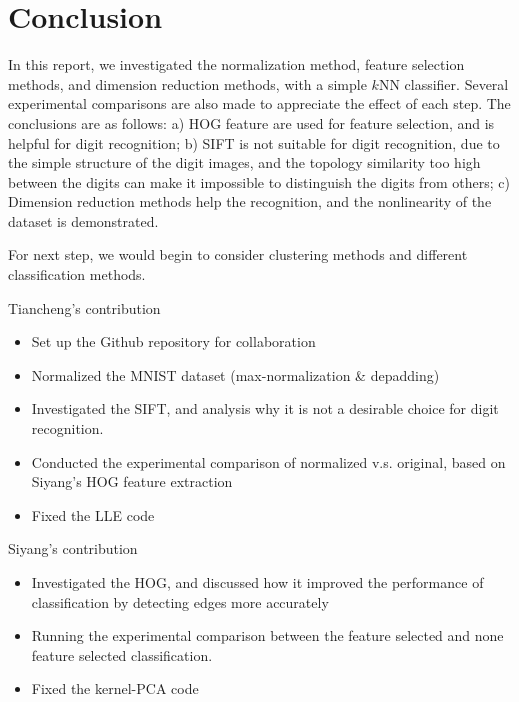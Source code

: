 \documentclass[12pt]{article}
\newenvironment{nscenter}
 {\parskip=0pt\par\nopagebreak\centering}
 {\par\noindent\ignorespacesafterend}
\begin{document}
\section{Conclusion}
In this report, we investigated the normalization method, feature selection methods, and dimension reduction methods, with a simple $k$NN classifier. Several experimental comparisons are also made to appreciate the effect of each step. The conclusions are as follows: a) HOG feature are used for feature selection, and is helpful for digit recognition; b) SIFT is not suitable for digit recognition, due to the simple structure of the digit images, and the topology similarity too high between the digits can make it impossible to distinguish the digits from others; c) Dimension reduction methods help the recognition, and the nonlinearity of the dataset is demonstrated.

For next step, we would begin to consider clustering methods and different classification methods.




\newpage
\begin{nscenter}
\Large{Tiancheng's contribution}
\end{nscenter}
\begin{itemize}
\item Set up the Github repository for collaboration
\item Normalized the MNIST dataset (max-normalization \& depadding)
\item Investigated the SIFT, and analysis why it is not a desirable choice for digit recognition.
\item Conducted the experimental comparison of normalized v.s. original, based on Siyang's HOG feature extraction
\item Fixed the LLE code
\end{itemize}

\newpage
\begin{nscenter}
\Large{Siyang's contribution}
\end{nscenter}
\begin{itemize}
\item Investigated the HOG, and discussed how it improved the performance of classification by detecting edges more accurately
\item Running the experimental comparison between the feature selected and none feature selected classification.
\item Fixed the kernel-PCA code
\end{itemize}



\end{document}
